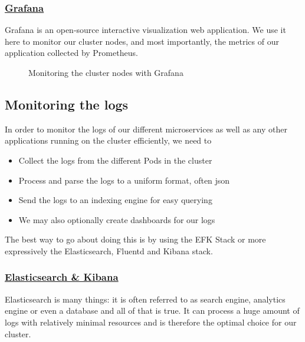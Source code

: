 \subsubsection*{\underline{Grafana}}
Grafana is an open-source interactive visualization web application.
We use it here to monitor our cluster nodes, and most importantly, the metrics of our application collected by Prometheus.
\begin{figure}[H]
    \centering
    \caption{Monitoring the cluster nodes with Grafana}
    \label{fig:grafana-node-monitoring}
\end{figure}

\subsection{Monitoring the logs}
In order to monitor the logs of our different microservices as well as any other applications running on the cluster efficiently, we need to

\begin{itemize}
    \item Collect the logs from the different Pods in the cluster
    \item Process and parse the logs to a uniform format, often json
    \item Send the logs to an indexing engine for easy querying
    \item We may also optionally create dashboards for our logs
\end{itemize}
The best way to go about doing this is by using the EFK Stack or more expressively the Elasticsearch, Fluentd and Kibana stack.

\subsubsection*{\underline{Elasticsearch \& Kibana}}
Elasticsearch is many things: it is often referred to as search engine, analytics engine or even a database and all of that is true.
It can process a huge amount of logs with relatively minimal resources and is therefore the optimal choice for our cluster.

